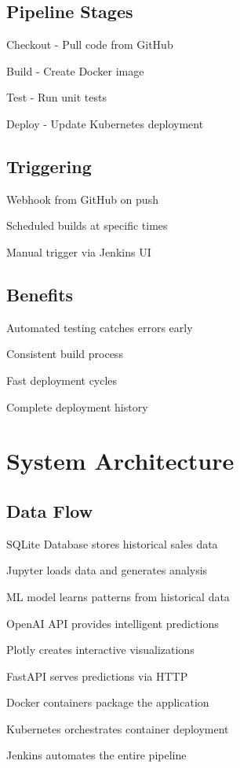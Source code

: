 \documentclass{article}
\begin{document}
\subsection{Pipeline Stages}

Checkout - Pull code from GitHub

Build - Create Docker image

Test - Run unit tests

Deploy - Update Kubernetes deployment

\subsection{Triggering}

Webhook from GitHub on push

Scheduled builds at specific times

Manual trigger via Jenkins UI

\subsection{Benefits}

Automated testing catches errors early

Consistent build process

Fast deployment cycles

Complete deployment history

\section{System Architecture}

\subsection{Data Flow}

SQLite Database stores historical sales data

Jupyter loads data and generates analysis

ML model learns patterns from historical data

OpenAI API provides intelligent predictions

Plotly creates interactive visualizations

FastAPI serves predictions via HTTP

Docker containers package the application

Kubernetes orchestrates container deployment

Jenkins automates the entire pipeline
\end{document}
